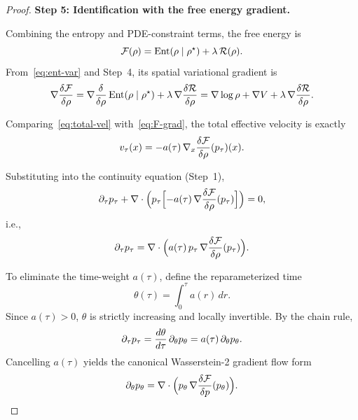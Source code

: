 \begin{proof}
\medskip
\noindent\textbf{Step 5: Identification with the free energy gradient.}

Combining the entropy and PDE-constraint terms, the free energy is
\begin{equation}
\mathcal{F}(\rho) = \mathrm{Ent}(\rho \mid \rho^{\star}) + \lambda\,\mathcal{R}(\rho).
\end{equation}
From~\eqref{eq:ent-var} and Step~4, its spatial variational gradient is
\begin{equation}
\label{eq:F-grad}
\nabla\frac{\delta\mathcal{F}}{\delta\rho}
  = \nabla\frac{\delta}{\delta\rho}\,\mathrm{Ent}(\rho \mid \rho^{\star})
    + \lambda\,\nabla\frac{\delta\mathcal{R}}{\delta\rho}
  = \nabla\log\rho + \nabla V + \lambda\,\nabla\frac{\delta\mathcal{R}}{\delta\rho}.
\end{equation}

Comparing~\eqref{eq:total-vel} with~\eqref{eq:F-grad}, the total effective velocity is exactly
\begin{equation}
\label{eq:vel-F}
v_{\tau}(x) = -a(\tau)\,\nabla_x\frac{\delta\mathcal{F}}{\delta\rho}(p_{\tau})(x).
\end{equation}

Substituting into the continuity equation (Step~1),
\begin{equation}
\partial_{\tau} p_{\tau} + \nabla \cdot \Bigl( p_{\tau}\Bigl[ -a(\tau)\,\nabla\frac{\delta\mathcal{F}}{\delta\rho}(p_{\tau}) \Bigr] \Bigr) = 0,
\end{equation}
i.e.,
\begin{equation}
\label{eq:main-pde}
\partial_{\tau} p_{\tau} = \nabla \cdot \Bigl( a(\tau)\,p_{\tau}\,\nabla\frac{\delta\mathcal{F}}{\delta\rho}(p_{\tau}) \Bigr).
\end{equation}

To eliminate the time-weight $a(\tau)$, define the reparameterized time
\begin{equation}
\theta(\tau) = \int_{0}^{\tau} a(r)\,dr.
\end{equation}
Since $a(\tau) > 0$, $\theta$ is strictly increasing and locally invertible.
By the chain rule,
\begin{equation}
\partial_{\tau} p_{\tau} = \frac{d\theta}{d\tau}\,\partial_{\theta}p_{\theta}
            = a(\tau)\,\partial_{\theta}p_{\theta}.
\end{equation}
Cancelling $a(\tau)$ yields the canonical Wasserstein-2 gradient flow form
\begin{equation}
\label{eq:W2-final}
\partial_{\theta} p_{\theta}
  = \nabla \cdot \Bigl( p_{\theta}\,\nabla\frac{\delta\mathcal{F}}{\delta p}(p_{\theta}) \Bigr).
\end{equation}


\end{proof}
